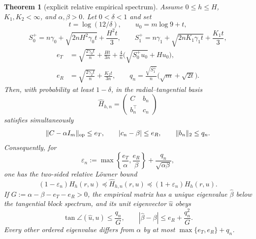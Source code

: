 \documentclass[11pt]{article}
\newtheorem{theorem}{Theorem}[section]
\begin{document}
\begin{theorem}[explicit relative empirical spectrum]
\label{thm:empirical}
Assume $0\le h\le H$, $K_1,K_2<\infty$, and $\alpha,\beta>0$.  Let
$0<\delta<1$ and set
\[
 t=\log(12/\delta),\qquad u_0=m\log9+t,
\]
\[
 S_0^+=n\gamma_0+\sqrt{2nH^2\gamma_0t}+\frac{H^2t}{3},\qquad
 S_1^+=n\gamma_1+\sqrt{2nK_1\gamma_1t}+\frac{K_1t}{3},
\]
\begin{align}
 e_T&=\sqrt{\frac{2\gamma_0t}{n}}+\frac{Ht}{3n}
 +\frac4n\bigl(\sqrt{S_0^+u_0}+Hu_0\bigr),\label{eq:et}\\
 e_R&=\sqrt{\frac{2\gamma_2t}{n}}+\frac{K_2t}{3n},\qquad
 q_n=\frac{\sqrt{S_1^+}}n\bigl(\sqrt m+\sqrt{2t}\bigr).\label{eq:erq}
\end{align}
Then, with probability at least $1-\delta$, in the radial--tangential basis
\[
 \widehat H_{h,n}=\begin{pmatrix}C&b_n\\b_n^\top&c_n\end{pmatrix}
\]
satisfies simultaneously
\begin{equation}
 \lVert C-\alpha I_m\rVert_{\rm op}\le e_T,\qquad
 |c_n-\beta|\le e_R,\qquad \lVert b_n\rVert_2\le q_n.
 \label{eq:blockevent}
\end{equation}
Consequently, for
\begin{equation}
 \varepsilon_n:=\max\left\{\frac{e_T}{\alpha},\frac{e_R}{\beta}\right\}
 +\frac{q_n}{\sqrt{\alpha\beta}},
 \label{eq:epsn}
\end{equation}
one has the two-sided relative L\"owner bound
\begin{equation}
 (1-\varepsilon_n)H_h(r,u)\preceq\widehat H_{h,n}(r,u)
 \preceq(1+\varepsilon_n)H_h(r,u).
 \label{eq:relativegram}
\end{equation}
If $G:=\alpha-\beta-e_T-e_R>0$, the empirical matrix has a unique eigenvalue
$\widehat\beta$ below the tangential block spectrum, and its unit eigenvector $\widehat u$ obeys
\begin{equation}
 \tan\angle(\widehat u,u)\le\frac{q_n}{G},\qquad
 |\widehat\beta-\beta|\le e_R+\frac{q_n^2}{G}.
 \label{eq:angle}
\end{equation}
Every other ordered eigenvalue differs from $\alpha$ by at most
$\max\{e_T,e_R\}+q_n$.
\end{theorem}
\end{document}
